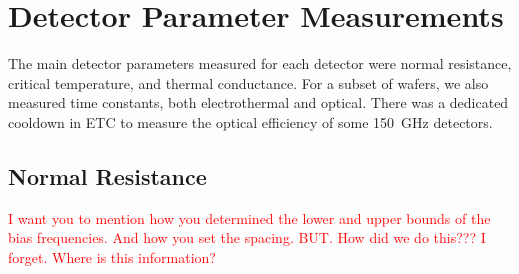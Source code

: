 \section{Detector Parameter Measurements}
\label{sec:parameter_measurements}

The main detector parameters measured for each detector were normal resistance, critical temperature, and thermal conductance. 
For a subset of wafers, we also measured time constants, both electrothermal and optical. 
There was a dedicated cooldown in \ac{ETC} to measure the optical efficiency of some 150~GHz detectors. 

\subsection{Normal Resistance}
\label{sec:normal_resistance}





\textcolor{red}{I want you to mention how you determined the lower and upper bounds of the bias frequencies. And how you set the spacing. BUT. How did we do this??? I forget. Where is this information?}

